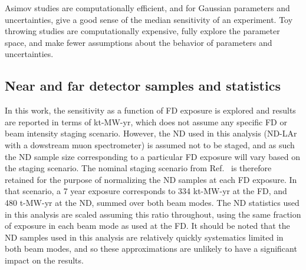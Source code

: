 Asimov studies are computationally efficient, and for Gaussian parameters and uncertainties, give a good sense of the median sensitivity of an experiment. Toy throwing studies are computationally expensive, fully explore the parameter space, and make fewer assumptions about the behavior of parameters and uncertainties.


\subsection{Near and far detector samples and statistics}
In this work, the sensitivity as a function of FD exposure is explored and results are reported in terms of kt-MW-yr, which does not assume any specific FD or beam intensity staging scenario. However, the ND used in this analysis (ND-LAr with a dowstream muon spectrometer) is assumed not to be staged, and as such the ND sample size corresponding to a particular FD exposure will vary based on the staging scenario. The nominal staging scenario from Ref.~\cite{Abi:2020qib} is therefore retained for the purpose of normalizing the ND samples at each FD exposure. In that scenario, a 7 year exposure corresponds to 334 kt-MW-yr at the FD, and 480 t-MW-yr at the ND, summed over both beam modes. The ND statistics used in this analysis are scaled assuming this ratio throughout, using the same fraction of exposure in each beam mode as used at the FD. It should be noted that the ND samples used in this analysis are relatively quickly systematics limited in both beam modes, and so these approximations are unlikely to have a significant impact on the results.

